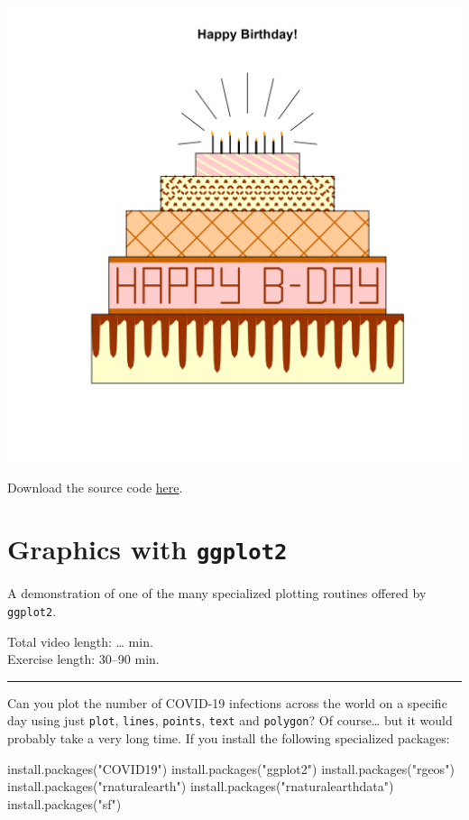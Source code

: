 \documentclass[
]{book}
\newenvironment{Shaded}{\begin{snugshade}}{\end{snugshade}}
\newcommand{\FunctionTok}[1]{\textcolor[rgb]{0.00,0.00,0.00}{#1}}
\newcommand{\NormalTok}[1]{#1}
\newcommand{\StringTok}[1]{\textcolor[rgb]{0.31,0.60,0.02}{#1}}
\begin{document}
\includegraphics[width=28in]{figures/AS2022cake}

Download the source code \href{files/cake-winner-AS-2022.Rmd}{here}.

\hypertarget{ggplot2}{%
\chapter{\texorpdfstring{Graphics with \texttt{ggplot2}}{Graphics with ggplot2}}\label{ggplot2}}

A demonstration of one of the many specialized plotting routines offered by \texttt{ggplot2}.

Total video length: \ldots{} min.\\
Exercise length: 30--90 min.

\begin{center}\rule{0.5\linewidth}{0.5pt}\end{center}

Can you plot the number of COVID-19 infections across the world on a specific day using just \texttt{plot}, \texttt{lines}, \texttt{points}, \texttt{text} and \texttt{polygon}? Of course\ldots{} but it would probably take a very long time. If you install the following specialized packages:

\begin{Shaded}
\begin{Highlighting}[]
\FunctionTok{install.packages}\NormalTok{(}\StringTok{"COVID19"}\NormalTok{)}
\FunctionTok{install.packages}\NormalTok{(}\StringTok{"ggplot2"}\NormalTok{)}
\FunctionTok{install.packages}\NormalTok{(}\StringTok{"rgeos"}\NormalTok{)}
\FunctionTok{install.packages}\NormalTok{(}\StringTok{"rnaturalearth"}\NormalTok{)}
\FunctionTok{install.packages}\NormalTok{(}\StringTok{"rnaturalearthdata"}\NormalTok{)}
\FunctionTok{install.packages}\NormalTok{(}\StringTok{"sf"}\NormalTok{)}
\end{Highlighting}
\end{Shaded}
\end{document}
